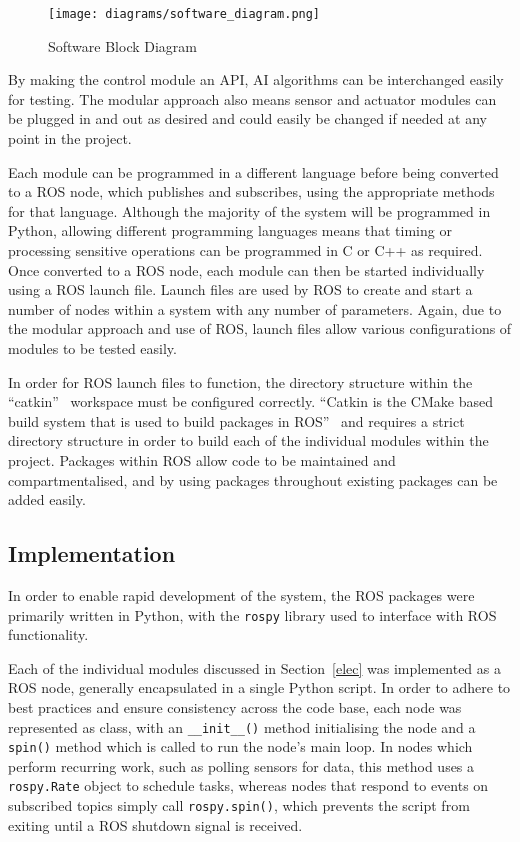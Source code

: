 \begin{figure}[!ht]
	\centering
	\texttt{[image: diagrams/software\_diagram.png]}
	\caption{Software Block Diagram}\label{BlockDiagram}

\end{figure}

By making the control module
an API, AI algorithms can be interchanged easily for testing. The modular
approach also means sensor and actuator modules can be plugged in and out as
desired and could easily be changed if needed at any point in the project.

Each module can be programmed in a different language before being converted to a
ROS node, which publishes and subscribes, using the appropriate methods for that
language. Although the majority of the system will be programmed in Python,
allowing different programming languages means that timing or processing
sensitive operations can be programmed in C or C++ as required. Once converted to
a ROS node, each module can then be started individually using a ROS launch file.
Launch files are used by ROS to create and start a number of nodes within a
system with any number of parameters. Again, due to the modular approach and use
of ROS, launch files allow various configurations of modules to be tested easily.

In order for ROS launch files to function, the directory structure within the
``catkin''~\cite{catkin} workspace must be configured correctly. ``Catkin is the
CMake based build system that is used to build packages in ROS''~\cite{gitcatkin}
and requires a strict directory structure in order to build each of the
individual modules within the project. Packages within ROS allow code to be
maintained and compartmentalised, and by using packages throughout existing
packages can be added easily.


\subsection{Implementation}\label{soft/ROS/impl}
In order to enable rapid development of the system, the ROS packages were
primarily written in Python, with the \verb|rospy| library used to
interface with ROS functionality.

Each of the individual modules discussed in Section~\ref{elec} was
implemented as a ROS node, generally encapsulated in a single Python
script. In order to adhere to best practices and ensure consistency across
the code base, each node was represented as class, with an
\verb|__init__()| method initialising the node and a \verb|spin()| method
which is called to run the node's main loop. In nodes which perform
recurring work, such as polling sensors for data, this method uses a
\verb|rospy.Rate| object to schedule tasks, whereas nodes that respond to
events on subscribed topics simply call \verb|rospy.spin()|, which
prevents the script from exiting until a ROS shutdown signal is received.

